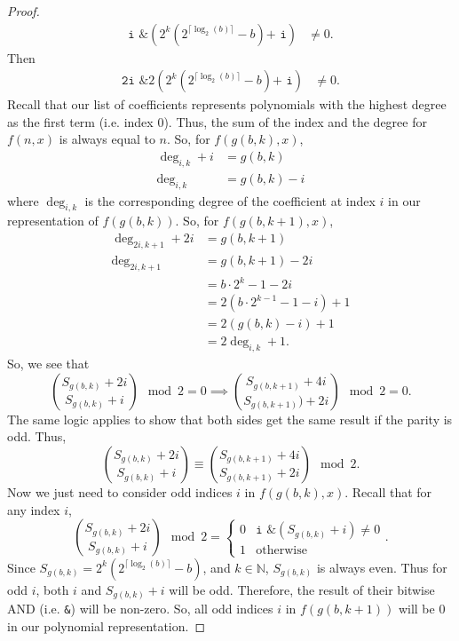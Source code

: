 \documentclass[a4paper]{article}
\newcommand{\N}{\mathbb{N}}
\begin{document}
\begin{proof}
\begin{align*}
			\texttt{i \& }\left(2^{k}\left(2^{\lceil\log_2{(b)}\rceil} - b\right)\texttt{+ i}\right) &\neq 0.
		\end{align*}
		Then
		\begin{align*}
			\texttt{2i \& }2\left(2^{k}\left(2^{\lceil\log_2{(b)}\rceil} - b\right)\texttt{+ i}\right) &\neq 0.
		\end{align*}
		Recall that our list of coefficients represents polynomials with the highest degree as the first term (i.e. index 0).
		Thus, the sum of the index and the degree for $f(n,x)$ is always equal to $n$.
		So, for $f(g(b,k),x)$,
		\begin{align*}
			\deg_{i,k} + i &= g(b,k) \\
			\deg_{i,k} &= g(b,k) - i
		\end{align*}
		where $\deg_{i,k}$ is the corresponding degree of the coefficient at index $i$ in our representation of $f(g(b,k))$.
		So, for $f(g(b,k+1),x)$,
		\begin{align*}
			\deg_{2i,k+1} + 2i &= g(b,k+1) \\
			\deg_{2i,k+1} &= g(b,k+1) - 2i \\
			&= b\cdot2^{k} - 1 - 2i \\
			&= 2\left(b\cdot2^{k-1} - 1 - i\right) + 1 \\
			&= 2\left(g(b,k) - i\right) + 1 \\
			&= 2\deg_{i,k} + 1.
		\end{align*}
		So, we see that
		\begin{equation*}
			\binom{S_{g(b,k)} + 2i}{S_{g(b,k)} + i} \mod 2 = 0 \implies \binom{S_{g(b,k+1)} + 4i}{S_{g(b,k+1)}) + 2i} \mod 2 = 0.
		\end{equation*}
		The same logic applies to show that both sides get the same result if the parity is odd. Thus,
		\begin{equation*}
			\binom{S_{g(b,k)} + 2i}{S_{g(b,k)} + i} \equiv \binom{S_{g(b,k+1)} + 4i}{S_{g(b,k+1)} + 2i} \mod 2.
		\end{equation*}
		Now we just need to consider odd indices $i$ in $f(g(b,k),x)$.
		Recall that for any index $i$,
		\begin{equation*}
			\binom{S_{g(b,k)} + 2i}{S_{g(b,k)} + i} \mod 2 =\begin{cases}
				0 & \texttt{i \& }\left(S_{g(b,k)} + i\right) \neq 0 \\
				1 & \text{otherwise}
			\end{cases}.
		\end{equation*}
		Since $S_{g(b,k)} = 2^k\left(2^{\lceil \log_2{(b)} \rceil} - b\right)$, and $k \in \N$,
		$S_{g(b,k)}$ is always even.
		Thus for odd $i$, both $i$ and $S_{g(b,k)} + i$ will be odd.
		Therefore, the result of their bitwise AND (i.e. \texttt{\&}) will be non-zero.
		So, all odd indices $i$ in $f(g(b,k+1))$ will be 0 in our polynomial representation.
	\end{proof}
\end{document}
